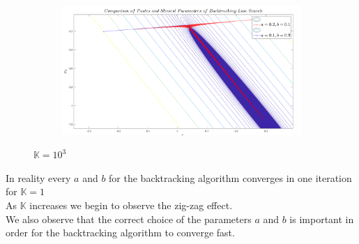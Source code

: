 \documentclass[12pt]{article}
\begin{document}
\begin{enumerate}
\begin{enumerate}
\begin{figure}
\begin{subfigure}[b]{0.45\textwidth}
				\end{subfigure}
				\hfill
				\begin{subfigure}[b]{0.45\textwidth}
					\centering
					\includegraphics[width=\textwidth]{5_2.png}
				\end{subfigure}
				\caption{$\mathbb{K}=10^3$}
			\end{figure}
			In reality every $a$ and $b$ for the backtracking algorithm converges in one iteration for $\mathbb{K}=1$\\
			As $\mathbb{K}$ increases we begin to observe the zig-zag effect.\\
			We also observe that the  correct choice of the parameters $a$ and $b$ is important in order for the backtracking algorithm to converge fast.
			

\end{enumerate}
\end{enumerate}
\end{document}
